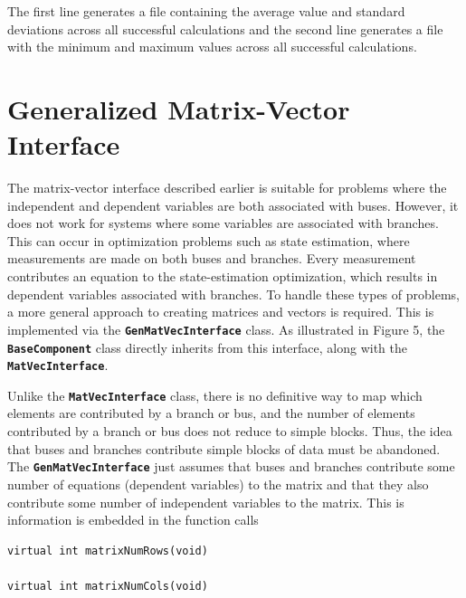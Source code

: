 \documentclass[12pt]{report} %
\begin{document}
The first line generates a file containing the average value and standard deviations across all successful calculations and the second line generates a file with the minimum and maximum values across all successful calculations.

\chapter{Generalized Matrix-Vector Interface}

The matrix-vector interface described earlier is suitable for problems where the independent and dependent variables are both associated with buses. However, it does not work for systems where some variables are associated with branches. This can occur in optimization problems such as state estimation, where measurements are made on both buses and branches. Every measurement contributes an equation to the state-estimation optimization, which results in dependent variables associated with branches. To handle these types of problems, a more general approach to creating matrices and vectors is required. This is implemented via the \texttt{\textbf{GenMatVecInterface}} class. As illustrated in Figure 5, the \texttt{\textbf{BaseComponent}} class directly inherits from this interface, along with the \texttt{\textbf{MatVecInterface}}. 

Unlike the \texttt{\textbf{MatVecInterface}} class, there is no definitive way to map which elements are contributed by a branch or bus, and the number of elements contributed by a branch or bus does not reduce to simple blocks. Thus, the idea that buses and branches contribute simple blocks of data must be abandoned. The \texttt{\textbf{GenMatVecInterface}} just assumes that buses and branches contribute some number of equations (dependent variables) to the matrix and that they also contribute some number of independent variables to the matrix. This is information is embedded in the function calls

{
\color{red}
\begin{Verbatim}[fontseries=b]
virtual int matrixNumRows(void)

virtual int matrixNumCols(void)
\end{Verbatim}
}
\end{document}
